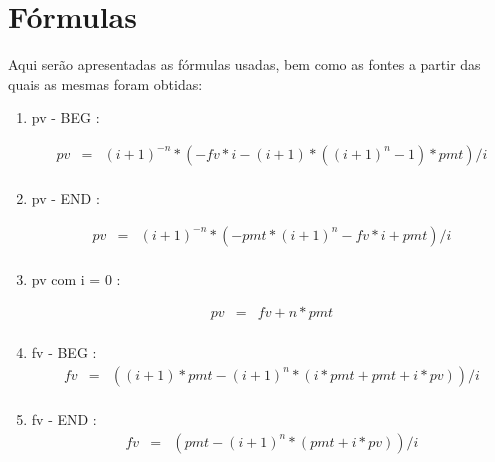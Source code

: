 \chapter{Fórmulas} \label{formulas}

Aqui serão apresentadas as fórmulas usadas, bem como as fontes a partir das quais as mesmas foram obtidas: \\

\begin{enumerate}
 \item pv - BEG \cite{arachnoid}:

\begin{eqnarray*}
pv &=& (i+1)^{-n} * ( -fv*i - (i+1) * ( (i+1)^{n} -1)*pmt  ) / i\\
\end{eqnarray*}


\item pv - END \cite{arachnoid}:

\begin{eqnarray*}
	pv &=& (i+1)^{-n} * ( -pmt*(i+1)^{n} - fv*i + pmt) / i \\
\end{eqnarray*}


\item pv com i = 0 \cite{matFinanceira}: 

\begin{eqnarray*}
  pv &=& fv + n * pmt  \\
\end{eqnarray*} 


\item fv - BEG \cite{arachnoid}:
\begin{eqnarray*}
 fv &=& ( (i+1)*pmt - (i+1)^{n}*(i*pmt + pmt + i*pv) ) / i \\
\end{eqnarray*}


\item fv - END \cite{arachnoid}: 
\begin{eqnarray*}
fv &=& ( pmt - (i+1)^{n} * (pmt + i*pv) ) / i \\
\end{eqnarray*}


\end{enumerate}
